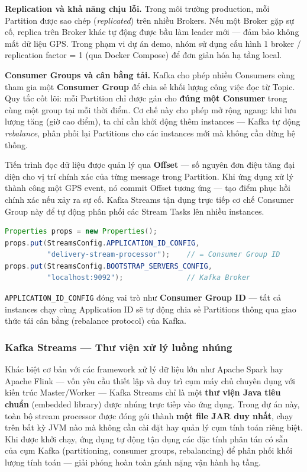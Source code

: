\bigskip
\noindent
\textbf{Replication và khả năng chịu lỗi.} Trong môi trường production, mỗi Partition được sao chép (\textit{replicated}) trên nhiều Brokers. Nếu một Broker gặp sự cố, replica trên Broker khác tự động được bầu làm leader mới — đảm bảo không mất dữ liệu GPS. Trong phạm vi dự án demo, nhóm sử dụng cấu hình 1 broker / replication factor = 1 (qua Docker Compose) để đơn giản hóa hạ tầng local.

\bigskip
\noindent
\textbf{Consumer Groups và cân bằng tải.} Kafka cho phép nhiều Consumers cùng tham gia một \textbf{Consumer Group} để chia sẻ khối lượng công việc đọc từ Topic. Quy tắc cốt lõi: mỗi Partition chỉ được gán cho \textbf{đúng một Consumer} trong cùng một group tại mỗi thời điểm. Cơ chế này cho phép mở rộng ngang: khi lưu lượng tăng (giờ cao điểm), ta chỉ cần khởi động thêm instances — Kafka tự động \textit{rebalance}, phân phối lại Partitions cho các instances mới mà không cần dừng hệ thống.

Tiến trình đọc dữ liệu được quản lý qua \textbf{Offset} — số nguyên đơn điệu tăng đại diện cho vị trí chính xác của từng message trong Partition. Khi ứng dụng xử lý thành công một GPS event, nó commit Offset tương ứng — tạo điểm phục hồi chính xác nếu xảy ra sự cố. Kafka Streams tận dụng trực tiếp cơ chế Consumer Group này để tự động phân phối các Stream Tasks lên nhiều instances.

\begin{lstlisting}[language=Java, caption={Kafka Streams sử dụng Consumer Group Protocol --- mỗi instance tự động nhận Partitions}, label={lst:kafka-config}]
Properties props = new Properties();
props.put(StreamsConfig.APPLICATION_ID_CONFIG,
          "delivery-stream-processor");    // = Consumer Group ID
props.put(StreamsConfig.BOOTSTRAP_SERVERS_CONFIG,
          "localhost:9092");               // Kafka Broker
\end{lstlisting}

\texttt{APPLICATION\_ID\_CONFIG} đóng vai trò như \textbf{Consumer Group ID} — tất cả instances chạy cùng Application ID sẽ tự động chia sẻ Partitions thông qua giao thức tái cân bằng (rebalance protocol) của Kafka.

\subsubsection{Kafka Streams — Thư viện xử lý luồng nhúng}
\label{sec:kafka-streams-intro}

Khác biệt cơ bản với các framework xử lý dữ liệu lớn như Apache Spark hay Apache Flink — vốn yêu cầu thiết lập và duy trì cụm máy chủ chuyên dụng với kiến trúc Master/Worker — Kafka Streams chỉ là một \textbf{thư viện Java tiêu chuẩn} (embedded library) được nhúng trực tiếp vào ứng dụng. Trong dự án này, toàn bộ stream processor được đóng gói thành \textbf{một file JAR duy nhất}, chạy trên bất kỳ JVM nào mà không cần cài đặt hay quản lý cụm tính toán riêng biệt. Khi được khởi chạy, ứng dụng tự động tận dụng các đặc tính phân tán có sẵn của cụm Kafka (partitioning, consumer groups, rebalancing) để phân phối khối lượng tính toán — giải phóng hoàn toàn gánh nặng vận hành hạ tầng.

